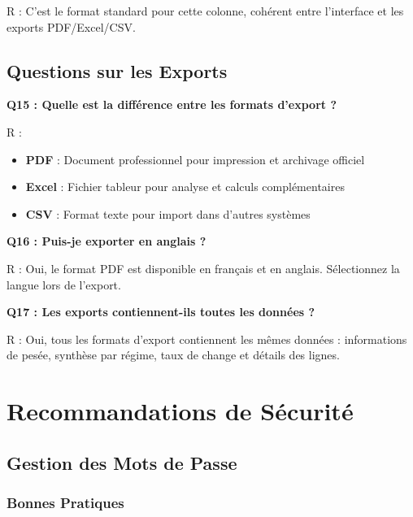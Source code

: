 \documentclass[12pt,a4paper]{report}
\begin{document}
R : C'est le format standard pour cette colonne, cohérent entre l'interface et les exports PDF/Excel/CSV.

\section{Questions sur les Exports}

\textbf{Q15 : Quelle est la différence entre les formats d'export ?}

R : 
\begin{itemize}[leftmargin=*]
    \item \textbf{PDF} : Document professionnel pour impression et archivage officiel
    \item \textbf{Excel} : Fichier tableur pour analyse et calculs complémentaires
    \item \textbf{CSV} : Format texte pour import dans d'autres systèmes
\end{itemize}

\textbf{Q16 : Puis-je exporter en anglais ?}

R : Oui, le format PDF est disponible en français et en anglais. Sélectionnez la langue lors de l'export.

\textbf{Q17 : Les exports contiennent-ils toutes les données ?}

R : Oui, tous les formats d'export contiennent les mêmes données : informations de pesée, synthèse par régime, taux de change et détails des lignes.

\chapter{Recommandations de Sécurité}

\section{Gestion des Mots de Passe}

\subsection{Bonnes Pratiques}
\end{document}
